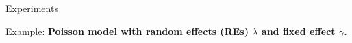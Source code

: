 
\begin{frame}{Experiments}

Example: \textbf{Poisson model with random effects (REs)
$\lambda$ and fixed effect $\gamma$.}

\HighDimAccuracyGraph{}

\end{frame}
